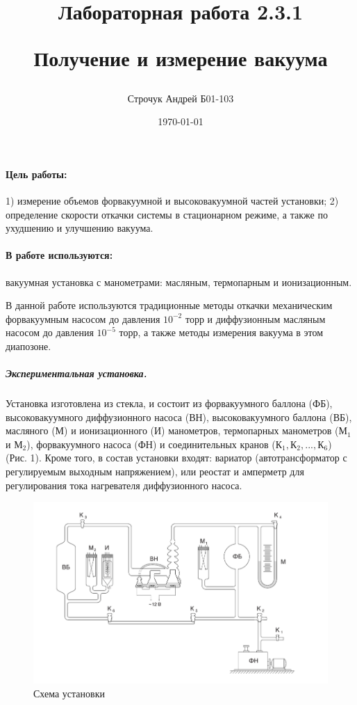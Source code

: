 \documentclass[a4paper,12pt]{article}
\author
{
	\vspace*{15 cm}		
	Строчук Андрей Б01-103
}
\title{Лабораторная работа 2.3.1

Получение и измерение вакуума}
\date{\today}
\begin{document}
\maketitle

\newpage

\paragraph{Цель работы:}
1) измерение объемов форвакуумной и высоковакуумной частей установки;
2) определение скорости откачки системы в стационарном режиме, а также по ухудшению и улучшению вакуума.
\paragraph{В работе используются:} вакуумная установка с манометрами: масляным, термопарным и ионизационным.




В данной работе используются традиционные методы откачки механическим форвакуумным насосом до давления $10^{-2}$ торр и диффузионным масляным насосом до давления $10^{-5}$ торр, а также методы измерения вакуума в этом диапозоне. 


\subparagraph*{Экспериментальная установка.} 
 	Установка изготовлена из стекла,
 и состоит из форвакуумного баллона (ФБ), высоковакуумного диффузионного насоса (ВН), высоковакуумного баллона (ВБ), масляного (М) и ионизационного (И) манометров, термопарных манометров ($\text{М}_1$ и $\text{М}_2$), форвакуумного насоса (ФН) и соединительных кранов ($К_1, К_2,..., К_6$) (Рис. 1). Кроме того, в состав установки входят: вариатор (автотрансформатор с регулируемым выходным напряжением), или реостат и амперметр для регулирования тока нагревателя диффузионного насоса. \\
  \begin{figure}[h]
 	\centering
 	\includegraphics[width=0.7 \textheight]{1.jpg}
 	\caption{Схема установки}
 	\label{fig:Схема установки}
 \end{figure}
\end{document}
